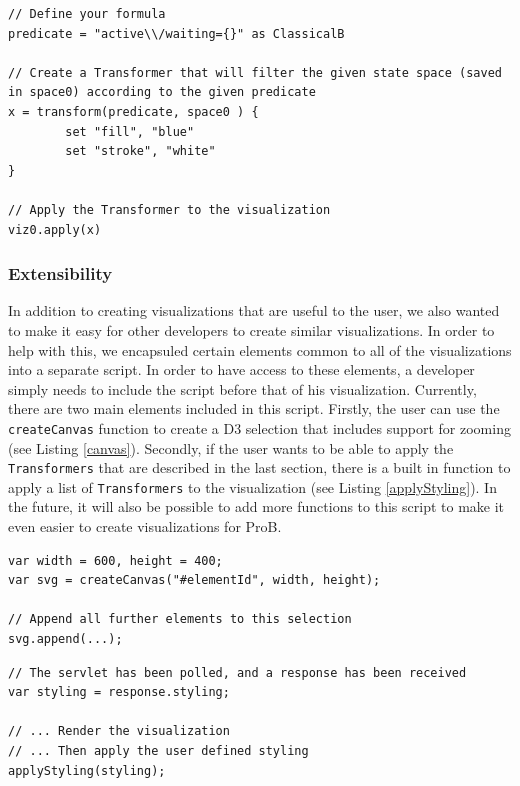 \begin{lstlisting}[caption=Create a \texttt{Transformer} based on the states that match a given predicate,label=dynamicTransformer]
// Define your formula
predicate = "active\\/waiting={}" as ClassicalB

// Create a Transformer that will filter the given state space (saved in space0) according to the given predicate
x = transform(predicate, space0 ) {
		set "fill", "blue"
		set "stroke", "white"
}

// Apply the Transformer to the visualization
viz0.apply(x)
\end{lstlisting}

\subsubsection{Extensibility}

In addition to creating visualizations that are useful to the user, we also wanted to make it easy for other developers to create similar visualizations. In order to help with this, we encapsuled certain elements common to all of the visualizations into a separate script. In order to have access to these elements, a developer simply needs to include the script before that of his visualization. Currently, there are two main elements included in this script. Firstly, the user can use the \texttt{createCanvas} function to create a D3 selection that includes support for zooming (see Listing \ref{canvas}). Secondly, if the user wants to be able to apply the \texttt{Transformers} that are described in the last section, there is a built in function to apply a list of \texttt{Transformers} to the visualization (see Listing \ref{applyStyling}). In the future, it will also be possible to add more functions to this script to make it even easier to create visualizations for ProB.

\begin{lstlisting}[caption=Append a D3 selection to an element that includes support for zooming,label=canvas]
var width = 600, height = 400;
var svg = createCanvas("#elementId", width, height);

// Append all further elements to this selection
svg.append(...);
\end{lstlisting}

\begin{lstlisting}[caption=Apply list of \texttt{Transformers} received from servlet,label=applyStyling]
// The servlet has been polled, and a response has been received
var styling = response.styling;

// ... Render the visualization
// ... Then apply the user defined styling
applyStyling(styling);
\end{lstlisting}


